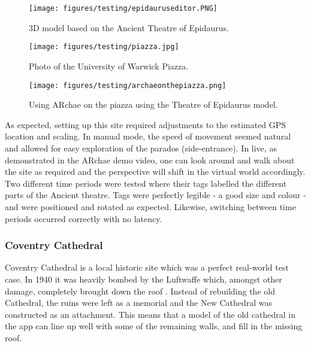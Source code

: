\documentclass[12pt, a4paper]{article}
\begin{document}
\vspace{0.5cm}

\begin{figure}[h]
\begin{minipage}{.48\textwidth}
    \centering
  \texttt{[image: figures/testing/epidauruseditor.PNG]}
  \caption{3D model based on the Ancient Theatre of Epidaurus.}
  \label{fig:epidaurus}
\end{minipage}
\begin{minipage}{.04\textwidth}
  \hspace{0.1cm}
\end{minipage}
\begin{minipage}{.48\textwidth}
    \centering
  \texttt{[image: figures/testing/piazza.jpg]}
  \caption{Photo of the University of Warwick Piazza.}
  \label{fig:piazza}
\end{minipage}
\end{figure}

\begin{figure}[h]
\centering
    \texttt{[image: figures/testing/archaeonthepiazza.png]}
        \caption{Using ARchae on the piazza using the Theatre of Epidaurus model.}
        \label{fig:piazzalive}
\end{figure}

\newpage
As expected, setting up this site required adjustments to the estimated GPS location and scaling. In manual mode, the speed of movement seemed natural and allowed for easy exploration of the parados (side-entrance). In live, as demonstrated in the ARchae demo video, one can look around and walk about the site as required and the perspective will shift in the virtual world accordingly. Two different time periods were tested where their tags labelled the different parts of the Ancient theatre. Tags were perfectly legible - a good size and colour - and were positioned and rotated as expected. Likewise, switching between time periods occurred correctly with no latency.

\subsubsection{Coventry Cathedral}
Coventry Cathedral is a local historic site which was a perfect real-world test case. In 1940 it was heavily bombed by the Luftwaffe which, amongst other damage, completely brought down the roof \cite{testing:covhistory}. Instead of rebuilding the old Cathedral, the ruins were left as a memorial and the New Cathedral was constructed as an attachment. This means that a model of the old cathedral in the app can line up well with some of the remaining walls, and fill in the missing roof. 
\end{document}
